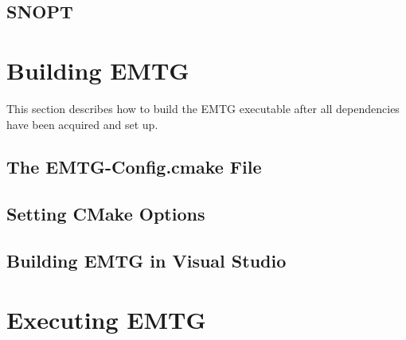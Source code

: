 \documentclass[11pt]{article}
\begin{document}


\subsection{SNOPT}
\label{sec:snopt}








\section{Building EMTG}
\label{sec:building_emtg}

This section describes how to build the \ac{EMTG} executable after all dependencies have been acquired and set up. 

\subsection{The EMTG-Config.cmake File}
\label{sec:emtg_config}



\subsection{Setting CMake Options}
\label{sec:setting_cmake_options}



\subsection{Building EMTG in Visual Studio}
\label{sec:building_emtg_in_visual_studio}




\section{Executing EMTG}
\label{sec:pyemtg_look_elsewhere}
\end{document}
